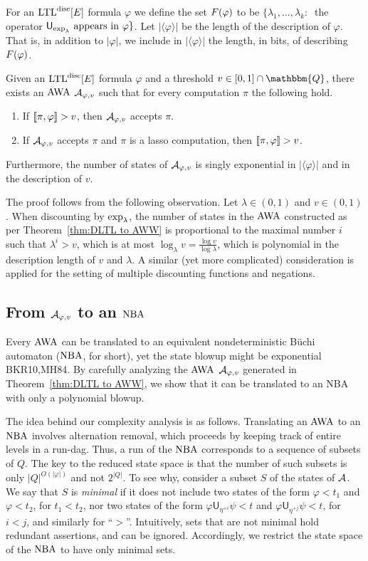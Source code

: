 \documentclass{llncs}
\newcommand{\Rat}{\mathbbm{Q}}
\newcommand{\zug}[1]{\langle #1  \rangle}
\newcommand{\LTL}{{\ensuremath{\rm LTL}}\xspace}
\newcommand{\Until}{\mathsf{U}}
\newcommand{\NBW}{\mbox{\rm NBA}\xspace}
\newcommand{\AWW}{\mbox{\rm AWA}\xspace}
\newcommand{\A}{{\cal A}}
\renewcommand{\phi}{\varphi}
\newcommand{\ST}{ : \:}
\newcommand{\DLTLE}{\ensuremath{\LTL^{\text{disc}}[E]}}
\newcommand{\df}{\eta}
\begin{document}
For an $\DLTLE$ formula $\phi$ we define the set $\fac(\phi)$ to be $\{\lambda_1,...,\lambda_k \ST$  the operator $\Until_{\dfl{\lambda}} \mbox{ appears in } \phi \}$. Let $|\zug{\phi}|$ be the length of the description of $\phi$. That is, in addition to $|\phi|$, we include in $|\zug{\phi}|$ the length, in bits, of describing $\fac(\phi)$.
\begin{theorem}
\label{thm: exp disc to AWW}
Given an $\DLTLE$ formula $\phi$ and a threshold $v\in [0,1]\cap \Rat$, there exists an $\AWW$ $\A_{\phi,v}$ such that for every computation $\pi$ the following hold.
\begin{enumerate}
\item If $\sem{\pi,\phi}>v$, then $\A_{\phi,v}$ accepts $\pi$.
\item If $\A_{\phi,v}$ accepts $\pi$ and $\pi$ is a lasso computation, then $\sem{\pi,\phi}> v$.
\end{enumerate} 
Furthermore, the number of states of $\A_{\phi,v}$ is singly exponential in $|\zug{\phi}|$ and in the description of $v$.
\end{theorem}
The proof follows from the following observation. Let $\lambda\in (0,1)$ and $v\in (0,1)$. When discounting by $\exp_{\lambda}$, the number of states in the $\AWW$ constructed as per Theorem~\ref{thm:DLTL to AWW} is proportional to the maximal number $i$ such that $\lambda^i>v$, which is at most $\log_\lambda v=\frac{\log v}{\log \lambda}$, which is polynomial in the description length of $v$ and $\lambda$. A similar (yet more complicated) consideration is applied for the setting of multiple discounting functions and negations.


\subsection{From $\A_{\phi,v}$ to an $\NBW$}
Every $\AWW$ can be translated to an equivalent nondeterministic B\"uchi automaton ($\NBW$, for short), yet the state blowup might be exponential 
{BKR10,MH84}. 
By carefully analyzing the $\AWW$ $\A_{\phi,v}$ generated in Theorem~\ref{thm:DLTL to AWW}, we show that it can be translated to an \NBW with only a polynomial blowup.

The idea behind our complexity analysis is as follows.
Translating an $\AWW$ to an $\NBW$ involves alternation removal, which proceeds by keeping track of 
entire 
levels in a run-{\sc dag}. Thus, a run of the $\NBW$ corresponds to a sequence of subsets of $Q$. The key to the reduced state space is that the number of such subsets is only $|Q|^{O(|\phi|)}$ and not $2^{|Q|}$. To see why, consider a subset $S$ of the states of $\A$. We say that $S$ is {\em minimal} if it does not include two states of the form $\phi<t_1$ and $\phi<t_2$, for $t_1<t_2$, nor two states of the form $\phi\Until_{\df^{+i}} \psi <t$ and $\phi\Until_{\df^{+j}}\psi <t$, for $i<j$, and similarly for ``$>$''. Intuitively, sets that are not minimal hold redundant assertions, and can be ignored. Accordingly, we restrict the state space of the $\NBW$ to have only minimal sets.
\end{document}
